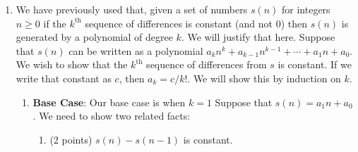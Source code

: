 \documentclass{article}
\def \proofDistance {5pt}
\newcommand{\proofseparator}{\par\noindent\rule{\textwidth}{0.4pt}}
\newcommand{\N}{\ensuremath{\mathbb{N}}}
\newcommand{\pf}[1]{
    \vspace{\proofDistance}
    \begin{proof}
    #1
    \end{proof}
    \proofseparator
}
\begin{document}
\begin{enumerate}
    \pf{\hfill
        \begin{itemize}
            \item \textbf{Base Case}: \\
            For $n = 1$: $2^1 = 2$, so our base case for $f(n) = 2^n$ is satisfied. \\

            \item \textbf{Inductive Hypothesis}: \\
            Suppose for some $n\in \N$, the statement, $f(n) = 2^n$. \\

            \item \textbf{Inductive Step}: \\
            We need to show that the properties of $f(n)$ hold for $f(n + 1) = 2^{n+1}$. \\

            Given that $f(a+b) = f(a) \cdot f(b)$, for all $a,b\in \N$, we can rewrite $f(n+1)$ as $f(n) \cdot f(1)$. Then, by the inductive hypothesis, we know that: 
            \begin{align*}
                f(n) + f(1) &= 2^n + 2 \\
                &= 2^{n + 1}
            \end{align*}
            Hence, this means that $f(n+1)$ upholds the specified characteristics of $f$.
            
        \end{itemize}
    }

\newpage

    \item We have previously used that, given a set of numbers $s(n)$ for integers $n \geq 0$ if the $k^\text{th}$ sequence of differences is constant (and not 0) then $s(n)$ is generated by a polynomial of degree $k$. We will justify that here. Suppose that $s(n)$ can be written as a polynomial $a_kn^k + a_{k-1}n^{k-1}+ \cdots + a_1n+a_0$. We wish to show that the $k^\text{th}$ sequence of differences from $s$ is constant. If we write that constant as $c$, then $a_k = c/k!$. We will show this by induction on $k$.

    \begin{enumerate}
        \item \textbf{Base Case}: Our base case is when $k = 1$ Suppose that $s(n) = a_1n + a_0$. We need to show two related facts: 
        \begin{enumerate}
            \item (2 points) $s(n) - s(n - 1)$ is constant. \\
            

\end{enumerate}
\end{enumerate}
\end{enumerate}
\end{document}
